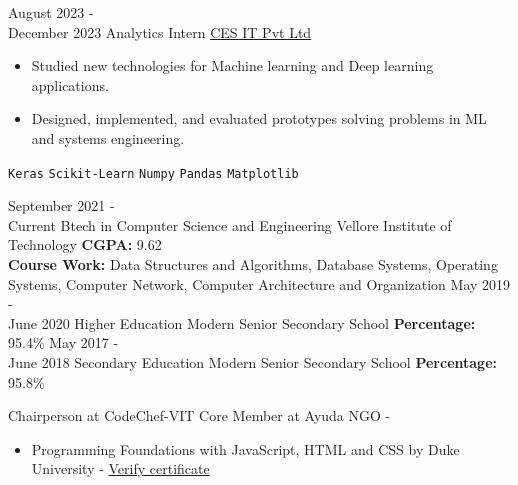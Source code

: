 \documentclass[9pt]{developercv}
\begin{document}

\vspace{-20 pt}
\vspace{-6pt}
\begin{entrylist}
  \entry
  {August 2023 - \\
    December 2023}
  {Analytics Intern}
  {\href{https://www.cesltd.com/}{CES IT Pvt Ltd}}
  {\vspace{-10pt}
    \begin{itemize}[noitemsep,topsep=0pt,parsep=0pt,partopsep=0pt, leftmargin=-1pt]
      \item {Studied new technologies for Machine learning and Deep learning applications.}
      \item {Designed, implemented, and evaluated prototypes solving problems in ML and systems engineering.}
    \end{itemize}
    \texttt{Keras} \slashsep \texttt{Scikit-Learn} \slashsep \texttt{Numpy} \slashsep \texttt{Pandas} \slashsep \texttt{Matplotlib}}
\end{entrylist}


\vspace{-10 pt}
\vspace{-6pt}
\begin{entrylist}
  \entry
  {September 2021 - \\ Current}
  {Btech in Computer Science and Engineering}
  {Vellore Institute of Technology}
  {\textbf{CGPA: }9.62\\
    \textbf{Course Work: }Data Structures and Algorithms, Database Systems, Operating Systems, Computer Network, Computer
    Architecture and Organization
  }
  \entry
  {May 2019 - \\ June 2020}
  {Higher Education}
  {Modern Senior Secondary School}
  {\textbf{Percentage: }95.4\%}
  \entry
  {May 2017 - \\ June 2018}
  {Secondary Education}
  {Modern Senior Secondary School}
  {\textbf{Percentage: }95.8\%}
\end{entrylist}


\vspace{-15 pt}
\vspace{-10pt}

\hspace{26mm} Chairperson at CodeChef-VIT \hspace{20mm}Core Member at Ayuda NGO -   

\vspace{-6pt}
\vspace{-10pt}

\begin{itemize}[noitemsep,topsep=0pt,parsep=0pt,partopsep=0pt, leftmargin=75pt]
  \item Programming Foundations with JavaScript, HTML and CSS by Duke University - \href{https://coursera.org/verify/ZZVTGPTSR36H}{Verify certificate}
\end{itemize}
\end{document}
